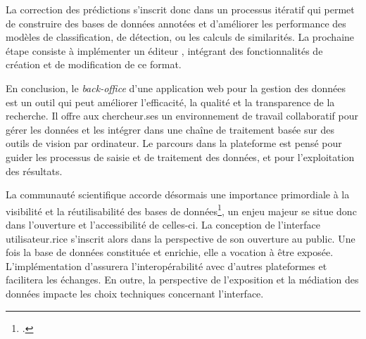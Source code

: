 La correction des prédictions s'inscrit donc dans un processus itératif
qui permet de construire des bases de données annotées et d'améliorer
les performance des modèles de classification, de détection, ou les calculs
de similarités. La prochaine étape consiste à implémenter un éditeur
\svg, intégrant des fonctionnalités de création et de modification de ce
format.

En conclusion, le \textit{back-office} d'une application web pour la gestion des
données est un outil qui peut améliorer l'efficacité, la qualité et la
transparence de la recherche. Il offre aux chercheur.ses un environnement
de travail collaboratif pour gérer les données et les intégrer dans une
chaîne de traitement basée sur des outils de vision par ordinateur. Le
parcours dans la plateforme est pensé pour guider les processus de
saisie et de traitement des données, et pour l'exploitation des
résultats.

La communauté scientifique accorde désormais une importance primordiale
à la visibilité et la réutilisabilité des bases de données\footcite{conference2023}, un enjeu majeur se situe donc dans l'ouverture et
l'accessibilité de celles-ci. La conception de l'interface utilisateur.rice
s'inscrit alors dans la perspective de son ouverture au public. Une
fois la base de données constituée et enrichie, elle a vocation à être
exposée. L'implémentation d'\apis assurera l'interopérabilité avec
d'autres plateformes et facilitera les échanges. En outre, la
perspective de l'exposition et la médiation des données impacte les
choix techniques concernant l'interface.